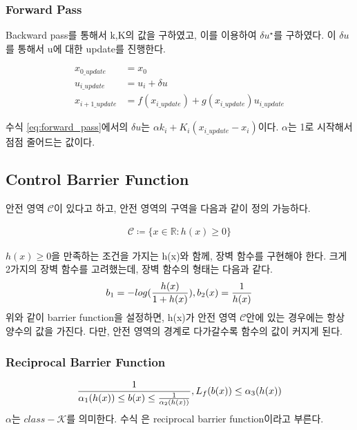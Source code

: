\documentclass[journal]{IEEEtran}
\begin{document}
\subsubsection{Forward Pass}
Backward pass를 통해서 k,K의 값을 구하였고, 이를 이용하여 $\delta u^{\star}$를 구하였다.
이 $\delta u$를 통해서 u에 대한 update를 진행한다.

\begin{align}
	x_{0\_update}&=x_0\nonumber\\
	u_{i\_update}&=u_i+\delta u\nonumber\\
	x_{i+1\_update}&=f(x_{i\_update})+g(x_{i\_update})u_{i\_update}
	\label{eq:forward_pass}	
\end{align}

수식 \eqref{eq:forward_pass}에서의 $\delta u$는 $\alpha k_i+K_i(x_{i\_update}-x_i)$이다. $\alpha$는 1로 시작해서 점점 줄어드는 값이다.

\subsection{Control Barrier Function}
안전 영역 $\mathcal{C}$이 있다고 하고, 안전 영역의 구역을 다음과 같이 정의 가능하다.

\begin{align}
	\mathcal{C} \coloneqq \{x \in \mathds{R} : h(x) \geq 0 \}
	\label{eq:safe_region}
\end{align}

$h(x) \geq 0$을 만족하는 조건을 가지는 h(x)와 함께, 장벽 함수를 구현해야 한다.
크게 2가지의 장벽 함수를 고려했는데, 장벽 함수의 형태는 다음과 같다.
\begin{align}
	b_1=-log({h(x)\over{1+h(x)}}), b_2(x)={1\over{ h(x)}}
	\label{eq:barrier_function}
\end{align}
위와 같이 barrier function을 설정하면, h(x)가 안전 영역 $\mathcal{C}$안에 있는 경우에는 항상 양수의 값을 가진다. 다만, 안전 영역의 경계로 다가갈수록 함수의 값이 커지게 된다.\\
 \subsubsection{Reciprocal Barrier Function}
 \begin{align}
 	{1 \over \alpha_1(h(x)) \leq b(x) \leq {1\over \alpha_2(h(x))} }, L_f(b(x))\leq \alpha_3(h(x))	
	\label{eq:reciprocal_barrier_function} 
\end{align}
$\alpha$는 $class-\mathcal{K}$를 의미한다. 수식 은 reciprocal barrier function이라고 부른다.
\end{document}
